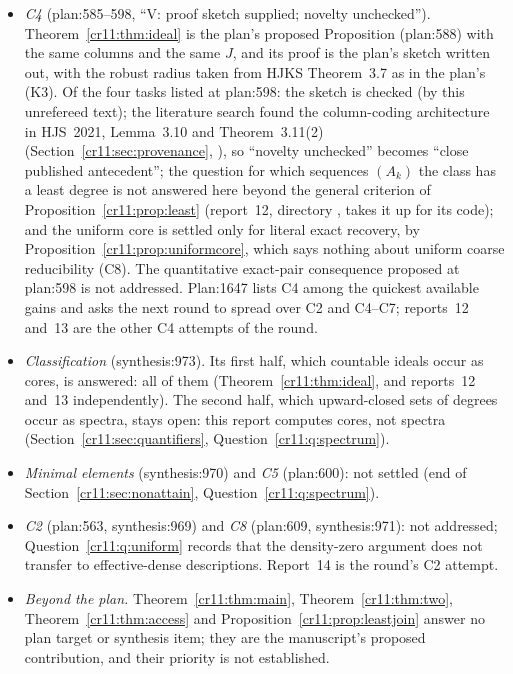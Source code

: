 \documentclass[11pt,letterpaper]{article}
\theoremstyle{plain}
\theoremstyle{definition}
\theoremstyle{remark}
\numberwithin{equation}{section}
\begin{document}
\begin{itemize}
\item \emph{C4} (plan:585--598, ``V: proof sketch supplied; novelty
unchecked''). Theorem~\ref{cr11:thm:ideal} is the plan's proposed
Proposition (plan:588) with the same columns and the same $J$, and its
proof is the plan's sketch written out, with the robust radius taken from
HJKS Theorem~3.7 as in the plan's (K3). Of the four tasks listed at
plan:598: the sketch is checked (by this unrefereed text); the literature
search found the column-coding architecture in HJS~2021, Lemma~3.10 and
Theorem~3.11(2) (Section~\ref{cr11:sec:provenance}, ), so
``novelty unchecked'' becomes ``close published antecedent''; the question
for which sequences $(A_k)$ the class has a least degree is not answered
here beyond the general criterion of Proposition~\ref{cr11:prop:least}
(report~12, directory , takes it up for its code); and the
uniform core is settled only for literal exact recovery, by
Proposition~\ref{cr11:prop:uniformcore}, which says nothing about uniform
coarse reducibility (C8). The quantitative exact-pair consequence proposed
at plan:598 is not addressed. Plan:1647 lists C4 among the quickest
available gains and asks the next round to spread over C2 and C4--C7;
reports~12 and~13 are the other C4 attempts of the round.
\item \emph{Classification} (synthesis:973). Its first half, which
countable ideals occur as cores, is answered: all of them
(Theorem~\ref{cr11:thm:ideal}, and reports~12 and~13 independently). The
second half, which upward-closed sets of degrees occur as spectra, stays
open: this report computes cores, not spectra
(Section~\ref{cr11:sec:quantifiers}, Question~\ref{cr11:q:spectrum}).
\item \emph{Minimal elements} (synthesis:970) and \emph{C5} (plan:600):
not settled (end of Section~\ref{cr11:sec:nonattain},
Question~\ref{cr11:q:spectrum}).
\item \emph{C2} (plan:563, synthesis:969) and \emph{C8} (plan:609,
synthesis:971): not addressed; Question~\ref{cr11:q:uniform} records that
the density-zero argument does not transfer to effective-dense
descriptions. Report~14 is the round's C2 attempt.
\item \emph{Beyond the plan.} Theorem~\ref{cr11:thm:main},
Theorem~\ref{cr11:thm:two}, Theorem~\ref{cr11:thm:access} and
Proposition~\ref{cr11:prop:leastjoin} answer no plan target or synthesis
item; they are the manuscript's proposed contribution, and their priority
is not established.
\end{itemize}
\end{document}
